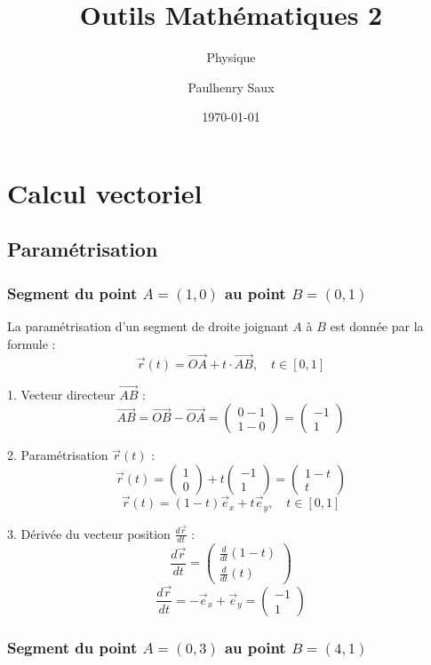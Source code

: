 \documentclass[french]{yLectureNote}
\title{Outils Mathématiques 2}
\subtitle{Physique}
\author{Paulhenry Saux}
\date{\today}
\renewcommand{\vec}{\overrightarrow}
\begin{document}
\setcounter{chapter}{2}
\chapter{Calcul vectoriel}
\section{Paramétrisation}
\subsection{Segment du point $A=(1,0)$ au point $B=(0,1)$}
La paramétrisation d'un segment de droite joignant $A$ à $B$ est donnée par la formule :
$$\vec{r}(t) = \vec{OA} + t \cdot \vec{AB}, \quad t \in [0, 1]$$

1.  Vecteur directeur $\vec{AB}$ :
    $$\vec{AB} = \vec{OB} - \vec{OA} = \begin{pmatrix} 0 - 1 \\ 1 - 0 \end{pmatrix} = \begin{pmatrix} -1 \\ 1 \end{pmatrix}$$

2.  Paramétrisation $\vec{r}(t)$ :
    $$\vec{r}(t) = \begin{pmatrix} 1 \\ 0 \end{pmatrix} + t \begin{pmatrix} -1 \\ 1 \end{pmatrix} = \begin{pmatrix} 1 - t \\ t \end{pmatrix}$$
    $$\vec{r}(t) = (1 - t) \vec{e}_x + t \vec{e}_y, \quad t \in [0, 1]$$

3.  Dérivée du vecteur position $\frac{d\vec{r}}{dt}$ :
    $$\frac{d\vec{r}}{dt} = \begin{pmatrix} \frac{d}{dt}(1 - t) \\ \frac{d}{dt}(t) \end{pmatrix}$$
    $$\frac{d\vec{r}}{dt} = - \vec{e}_x + \vec{e}_y = \begin{pmatrix} -1 \\ 1 \end{pmatrix}$$

\subsection{Segment du point $A=(0,3)$ au point $B=(4,1)$ }
\end{document}
